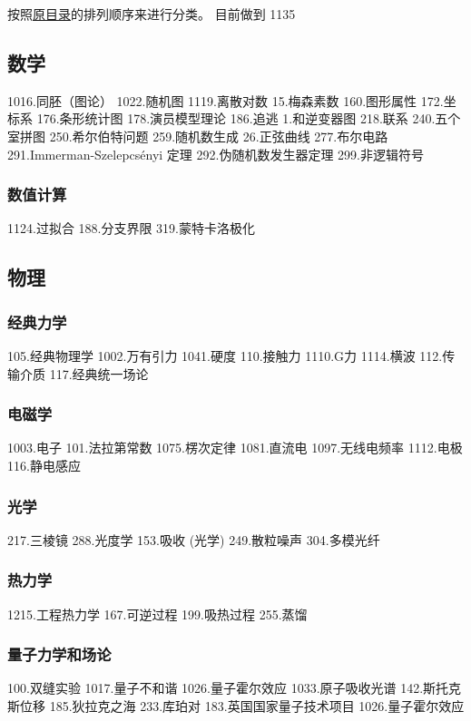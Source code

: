 
\begin{issues}
\issueDraft
\end{issues}

按照\href{https://wuli.wiki/assets/sogou}{原目录}的排列顺序来进行分类。 目前做到 1135

\subsection{数学}
1016.同胚（图论）
1022.随机图
1119.离散对数
15.梅森素数
160.图形属性
172.坐标系
176.条形统计图
178.演员模型理论
186.追逃
1.和逆变器图
218.联系
240.五个室拼图
250.希尔伯特问题
259.随机数生成
26.正弦曲线
277.布尔电路
291.Immerman-Szelepcsényi 定理
292.伪随机数发生器定理
299.非逻辑符号
\subsubsection{数值计算}
1124.过拟合
188.分支界限
319.蒙特卡洛极化

\subsection{物理}
\subsubsection{经典力学}
105.经典物理学
1002.万有引力
1041.硬度
110.接触力
1110.G力
1114.横波
112.传输介质
117.经典统一场论
\subsubsection{电磁学}
1003.电子
101.法拉第常数
1075.楞次定律
1081.直流电
1097.无线电频率
1112.电极
116.静电感应
\subsubsection{光学}
217.三棱镜
288.光度学
153.吸收 (光学)
249.散粒噪声
304.多模光纤
\subsubsection{热力学}
1215.工程热力学
167.可逆过程
199.吸热过程
255.蒸馏
\subsubsection{量子力学和场论}
100.双缝实验
1017.量子不和谐
1026.量子霍尔效应
1033.原子吸收光谱
142.斯托克斯位移
185.狄拉克之海
233.库珀对
183.英国国家量子技术项目
1026.量子霍尔效应
